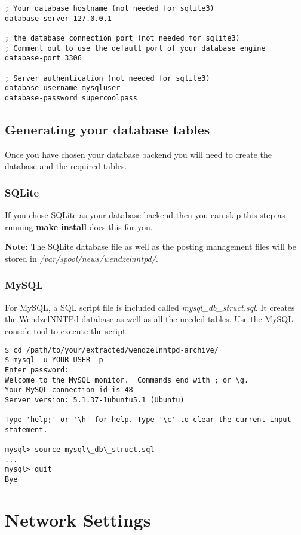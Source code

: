 \begin{verbatim}
; Your database hostname (not needed for sqlite3)
database-server 127.0.0.1

; the database connection port (not needed for sqlite3)
; Comment out to use the default port of your database engine
database-port 3306

; Server authentication (not needed for sqlite3)
database-username mysqluser
database-password supercoolpass
\end{verbatim}

\subsection{Generating your database tables}

Once you have chosen your database backend you will need to create the database and the required tables.

\subsubsection{SQLite}

If you chose SQLite as your database backend then you can skip this step as running \textbf{make install} does this for you.

\textbf{Note:} The SQLite database file as well as the posting management files will be stored in \textit{/var/spool/news/wendzelnntpd/}.

\subsubsection{MySQL}

For MySQL, a SQL script file is included called \textit{mysql\_db\_struct.sql}. It creates the WendzelNNTPd database as well as all the needed tables. Use the MySQL console tool to execute the script.

\begin{verbatim}
$ cd /path/to/your/extracted/wendzelnntpd-archive/
$ mysql -u YOUR-USER -p
Enter password:
Welcome to the MySQL monitor.  Commands end with ; or \g.
Your MySQL connection id is 48
Server version: 5.1.37-1ubuntu5.1 (Ubuntu)

Type 'help;' or '\h' for help. Type '\c' to clear the current input statement.

mysql> source mysql\_db\_struct.sql
...
mysql> quit
Bye
\end{verbatim}

\section{Network Settings}

